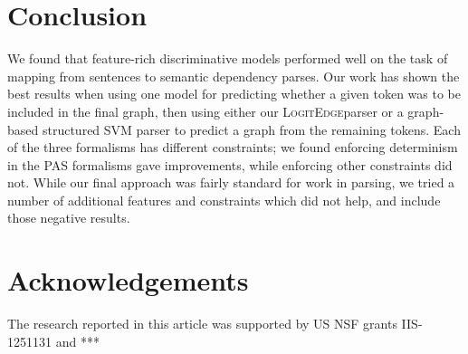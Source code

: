 \documentclass[11pt]{article}
\newcommand{\logitedge}{\textsc{LogitEdge}}
\begin{document}
\section{Conclusion}
We found that feature-rich discriminative models performed well on the task of
mapping from sentences to semantic dependency parses.
Our work has shown the best results when using one model for predicting whether
a given token was to be included in the final graph, then using either our
\logitedge parser or a graph-based structured SVM parser to predict a graph
from the remaining tokens.
Each of the three formalisms has different constraints;
we found enforcing determinism in the PAS formalisms gave improvements, while
enforcing other constraints did not.
While our final approach was fairly standard for work in parsing, we tried a
number of additional features and constraints which did not help, and include
those negative results.



\section*{Acknowledgements}
The research reported in this article was supported by US NSF grants IIS-1251131 and ***




\end{document}
